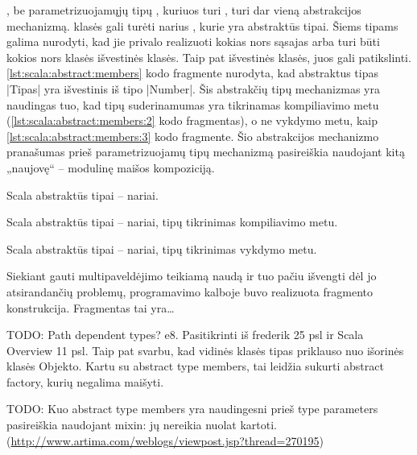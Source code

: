 , be parametrizuojamųjų tipų , kuriuos
turi , turi dar vieną abstrakcijos mechanizmą.
 klasės gali turėti narius , kurie
yra abstraktūs tipai. Šiems tipams galima nurodyti, kad jie privalo
realizuoti kokias nors sąsajas arba turi būti kokios nors klasės
išvestinės klasės. Taip pat išvestinės klasės, juos gali patikslinti.
\ref{lst:scala:abstract:members} kodo fragmente nurodyta, kad abstraktus
tipas \scala|Tipas| yra išvestinis iš tipo \scala|Number|. Šis
abstrakčių tipų mechanizmas yra naudingas tuo, kad tipų
suderinamumas yra tikrinamas kompiliavimo metu
(\ref{lst:scala:abstract:members:2} kodo fragmentas), o ne
vykdymo metu, kaip \ref{lst:scala:abstract:members:3} kodo fragmente.
Šio abstrakcijos mechanizmo pranašumas prieš parametrizuojamų tipų
mechanizmą pasireiškia naudojant kitą  „naujovę“
– modulinę maišos kompoziciją.

\begin{listing}[H]
  \caption{Scala abstraktūs tipai – nariai.}
  \label{lst:scala:abstract:members:1}
\end{listing}

\begin{listing}[H]
  \caption{Scala abstraktūs tipai – nariai, tipų tikrinimas
  kompiliavimo metu.}
  \label{lst:scala:abstract:members:2}
\end{listing}

\begin{listing}[H]
  \caption{Scala abstraktūs tipai – nariai, tipų tikrinimas
  vykdymo metu.}
  \label{lst:scala:abstract:members:3}
\end{listing}

Siekiant gauti multipaveldėjimo teikiamą naudą ir tuo pačiu išvengti
dėl jo atsirandančių problemų,  programavimo
kalboje buvo realizuota fragmento  konstrukcija.
Fragmentas tai yra…

TODO: Path dependent types? e8. Pasitikrinti iš frederik 25 psl ir
Scala Overview 11 psl. Taip pat svarbu, kad vidinės klasės tipas
priklauso nuo išorinės klasės Objekto. Kartu su abstract type
members, tai leidžia sukurti abstract factory, kurių negalima
maišyti.

TODO: Kuo abstract type members yra naudingesni prieš type parameters
pasireiškia naudojant mixin: jų nereikia nuolat kartoti.
(\url{http://www.artima.com/weblogs/viewpost.jsp?thread=270195})

